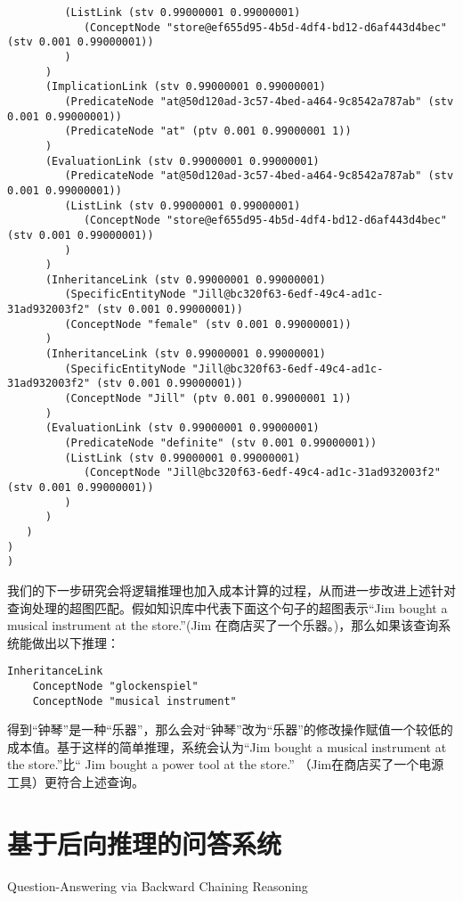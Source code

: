 {\begin{tiny}
\begin{lstlisting}
         (ListLink (stv 0.99000001 0.99000001)
            (ConceptNode "store@ef655d95-4b5d-4df4-bd12-d6af443d4bec" (stv 0.001 0.99000001))
         )
      )
      (ImplicationLink (stv 0.99000001 0.99000001)
         (PredicateNode "at@50d120ad-3c57-4bed-a464-9c8542a787ab" (stv 0.001 0.99000001))
         (PredicateNode "at" (ptv 0.001 0.99000001 1))
      )
      (EvaluationLink (stv 0.99000001 0.99000001)
         (PredicateNode "at@50d120ad-3c57-4bed-a464-9c8542a787ab" (stv 0.001 0.99000001))
         (ListLink (stv 0.99000001 0.99000001)
            (ConceptNode "store@ef655d95-4b5d-4df4-bd12-d6af443d4bec" (stv 0.001 0.99000001))
         )
      )
      (InheritanceLink (stv 0.99000001 0.99000001)
         (SpecificEntityNode "Jill@bc320f63-6edf-49c4-ad1c-31ad932003f2" (stv 0.001 0.99000001))
         (ConceptNode "female" (stv 0.001 0.99000001))
      )
      (InheritanceLink (stv 0.99000001 0.99000001)
         (SpecificEntityNode "Jill@bc320f63-6edf-49c4-ad1c-31ad932003f2" (stv 0.001 0.99000001))
         (ConceptNode "Jill" (ptv 0.001 0.99000001 1))
      )
      (EvaluationLink (stv 0.99000001 0.99000001)
         (PredicateNode "definite" (stv 0.001 0.99000001))
         (ListLink (stv 0.99000001 0.99000001)
            (ConceptNode "Jill@bc320f63-6edf-49c4-ad1c-31ad932003f2" (stv 0.001 0.99000001))
         )
      )
   )
)
)

\end{lstlisting}\end{tiny}}

我们的下一步研究会将逻辑推理也加入成本计算的过程，从而进一步改进上述针对查询处理的超图匹配。假如知识库中代表下面这个句子的超图表示“Jim bought a musical instrument at the store.”(Jim 在商店买了一个乐器。)，那么如果该查询系统能做出以下推理：

\begin{verbatim}
InheritanceLink
	ConceptNode "glockenspiel"
	ConceptNode "musical instrument"
\end{verbatim}

得到“钟琴”是一种“乐器”，那么会对“钟琴”改为“乐器”的修改操作赋值一个较低的成本值。基于这样的简单推理，系统会认为“Jim bought a musical instrument at the store.”比“ Jim bought a power tool at the store.” （Jim在商店买了一个电源工具）更符合上述查询。

\section{基于后向推理的问答系统}{Question-Answering via Backward Chaining Reasoning}

